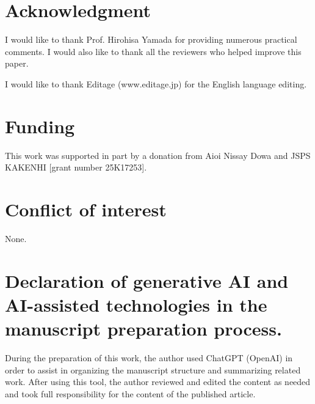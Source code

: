 \documentclass[preprint,12pt,number]{elsarticle}
\theoremstyle{plain} %
\theoremstyle{definition} %
\begin{document}
\section*{Acknowledgment}
I would like to thank Prof. Hirohisa Yamada for providing numerous practical comments. I would also like to thank all the reviewers who helped improve this paper. 

I would like to thank Editage (www.editage.jp) for the English language editing.

\section*{Funding}
This work was supported in part by a donation from Aioi Nissay Dowa and JSPS KAKENHI [grant number 25K17253].
\section*{Conflict of interest}
None.

\section*{Declaration of generative AI and AI-assisted technologies in the manuscript preparation process.}
During the preparation of this work, the author used ChatGPT (OpenAI) in order to assist in organizing the manuscript structure and summarizing related work. After using this tool, the author reviewed and edited the content as needed and took full responsibility for the content of the published article.

%
% 
%
%
%


\printbibliography
\end{document}

